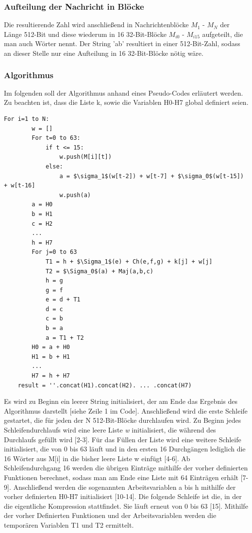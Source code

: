 \subsubsection{Aufteilung der Nachricht in Blöcke}
Die resultierende Zahl wird anschließend in Nachrichtenblöcke $M_1$ - $M_N$ der Länge 512-Bit und diese wiederum in 16 32-Bit-Blöcke $M_{i0}$ - $M_{i15}$ aufgeteilt, die man auch Wörter nennt. Der String 'ab' resultiert in einer 512-Bit-Zahl, sodass an dieser Stelle nur eine Aufteilung in 16 32-Bit-Blöcke nötig wäre.

\subsubsection{Algorithmus}
Im folgenden soll der Algorithmus anhand eines Pseudo-Codes erläutert werden. Zu beachten ist, dass die Liste k, sowie die Variablen H0-H7 global definiert seien.
\begin{lstlisting}[mathescape,caption={Pseudocode zu SHA256},captionpos=b]
	For i=1 to N:
		w = []
		For t=0 to 63:
			if t <= 15:
				w.push(M[i][t])
			else:
				a = $\sigma_1$(w[t-2]) + w[t-7] + $\sigma_0$(w[t-15]) + w[t-16]
				w.push(a)
		a = H0
		b = H1
		c = H2
		...
		h = H7
		For j=0 to 63
			T1 = h + $\Sigma_1$(e) + Ch(e,f,g) + k[j] + w[j]
			T2 = $\Sigma_0$(a) + Maj(a,b,c)
			h = g
			g = f
			e = d + T1
			d = c
			c = b
			b = a
			a = T1 + T2
		H0 = a + H0
		H1 = b + H1
		...
		H7 = h + H7
	result = ''.concat(H1).concat(H2). ... .concat(H7)
\end{lstlisting}
Es wird zu Beginn ein leerer String initialisiert, der am Ende das Ergebnis des Algorithmus darstellt [siehe Zeile 1 im Code].
Anschließend wird die erste Schleife gestartet, die für jeden der N 512-Bit-Blöcke durchlaufen wird. Zu Beginn jedes Schleifendurchlaufs wird eine leere Liste \emph{w} initialisiert, die während des Durchlaufs gefüllt wird [2-3].
Für das Füllen der Liste wird eine weitere Schleife initialisiert, die von 0 bis 63 läuft und in den ersten 16 Durchgängen lediglich die 16 Wörter aus M[i] in die bisher leere Liste w einfügt [4-6].
Ab Schleifendurchgang 16 werden die übrigen Einträge mithilfe der vorher definierten Funktionen berechnet, sodass man am Ende eine Liste mit 64 Einträgen erhält [7-9].
Anschließend werden die sogenannten Arbeitsvariablen a bis h mithilfe der vorher definierten H0-H7 initialisiert [10-14].
Die folgende Schleife ist die, in der die eigentliche Kompression stattfindet. Sie läuft erneut von 0 bis 63 [15].
Mithilfe der vorher Definierten Funktionen und der Arbeitsvariablen werden die temporären Variablen T1 und T2 ermittelt. 
